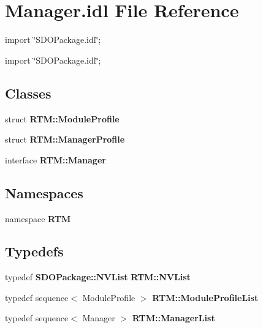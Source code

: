 \section{Manager.idl File Reference}
\label{Manager_8idl}
{\ttfamily import \char`\"{}SDOPackage.idl\char`\"{};}\par
{\ttfamily import \char`\"{}SDOPackage.idl\char`\"{};}\par
\subsection*{Classes}
\begin{DoxyCompactItemize}
\item 
struct {\bf RTM::ModuleProfile}
\item 
struct {\bf RTM::ManagerProfile}
\item 
interface {\bf RTM::Manager}
\end{DoxyCompactItemize}
\subsection*{Namespaces}
\begin{DoxyCompactItemize}
\item 
namespace {\bf RTM}
\end{DoxyCompactItemize}
\subsection*{Typedefs}
\begin{DoxyCompactItemize}
\item 
typedef {\bf SDOPackage::NVList} {\bf RTM::NVList}
\item 
typedef sequence$<$ ModuleProfile $>$ {\bf RTM::ModuleProfileList}
\item 
typedef sequence$<$ Manager $>$ {\bf RTM::ManagerList}
\end{DoxyCompactItemize}
